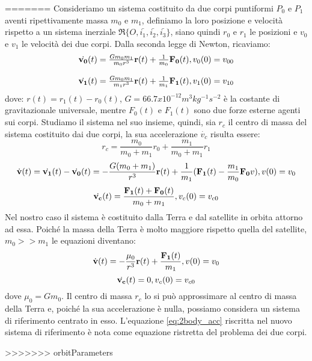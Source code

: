 =======
Consideriamo un sistema costituito da due corpi puntiformi $P_0$ e
$P_1$ aventi ripettivamente massa $m_0$ e $m_1$, definiamo la loro posizione e
velocità rispetto a un sistema inerziale $\mathfrak{R} \{
O,\bar{i_1},\bar{i_2},\bar{i_3}\}$, siano quindi $r_0$ e $r_1$ le posizioni e
$v_0$ e $v_1$ le velocità dei due corpi. Dalla seconda legge di Newton,
ricaviamo:
\begin{equation}
\begin{array}{l}
\dot{\bf v_0}(t)=\frac{Gm_0m_1}{m_0r^3}{\bf r}(t) +
\frac{1}{m_0}{\bf F_0}(t),v_0(0)=v_{00}\\\\
\dot{\bf v_1}(t)=\frac{Gm_0m_1}{m_1r^3}{\bf r}(t) +
\frac{1}{m_1}{\bf F_1}(t),v_1(0)=v_{10}
\end{array}
\end{equation}
dove: $r(t)=r_1(t)-r_0(t)$, $G=66.7x10^{-12} m^3kg^{-1}s^{-2}$ è la costante di
gravitazionale universale, mentre $F_0(t)$ e $F_1(t)$ sono due forze esterne
agenti sui corpi.
Studiamo il sistema nel suo insieme, quindi, sia $r_c$ il centro di massa del
sistema costituito dai due corpi, la sua accelerazione $\dot{v_c}$ risulta essere:
\[r_c=\frac{m_0}{m_0+m_1}r_0+\frac{m_1}{m_0+m_1}r_1\]
\begin{equation}
\dot{\bf v}(t)=\dot{\bf v_1}(t)-\dot{\bf v_0}(t)=-\frac{G(m_0+m_1)}{r^3}{\bf
r}(t)+\frac{1}{m_1}({\bf F_1}(t)-\frac{m_1}{m_0}{\bf F_0}v), v(0)=v_0
\end{equation}
\begin{equation}
\dot{\bf v_c}(t)=\frac{{\bf F_1}(t)+{\bf F_0}(t)}{m_0+m_1},v_c(0)=v_{c0}
\end{equation}
Nel nostro caso il sistema è costituito dalla Terra e dal satellite in orbita
attorno ad essa. Poiché la massa della Terra è molto maggiore rispetto quella
del satellite, $m_0>>m_1$ le equazioni diventano:
\begin{equation}
\dot{\bf v}(t)=-\frac{\mu_0}{r^3}{\bf r}(t)+\frac{{\bf F_1}(t)}{m_1}, v(0)=v_0
\label{eq:2body_acc}
\end{equation}
\begin{equation}
\dot{\bf v_c}(t)=0, v_c(0)=v_{c0}
\end{equation}
dove $\mu_0=Gm_0$.
Il centro di massa $r_c$ lo si può approssimare al centro di massa della Terra
e, poiché la sua accelerazione è nulla, possiamo considera un sistema di
riferimento centrato in esso. L'equazione \ref{eq:2body_acc} riscritta
nel nuovo sistema di riferimento è nota come equazione ristretta del problema
dei due corpi.

>>>>>>> orbitParameters
